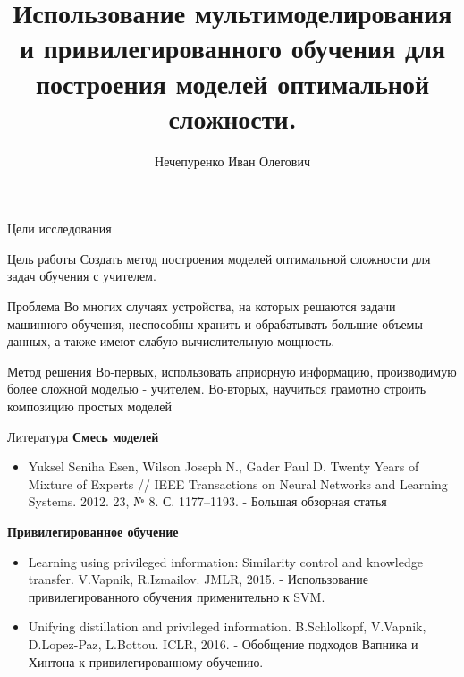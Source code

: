 \documentclass{beamer}
\title[\hbox to 56mm{Мультимоделирование, привилегированное обучение\hfill\insertframenumber\,/\,\inserttotalframenumber}]
{Использование мультимоделирования и привилегированного обучения для построения моделей оптимальной сложности. }
\author[]{\large Нечепуренко  Иван Олегович}
\institute{\large
Московский физико-технический институт \par Факультет Инноваций и Высоких Технологий \par Кафедра анализа данных}
\date{\footnotesize{2019 \par Москва}}
\begin{document}
\begin{frame}
\titlepage
\end{frame}
\begin{frame}{Цели исследования}

\begin{block}{Цель работы}
Создать метод построения моделей
оптимальной сложности для задач обучения с учителем.  
\end{block}

\begin{block}{Проблема}
Во многих случаях устройства,  на которых решаются задачи машинного обучения, неспособны хранить и обрабатывать большие объемы данных, а также имеют слабую вычислительную мощность.
\end{block}

\begin{block}{Метод решения}
Во-первых, использовать априорную информацию, производимую более сложной моделью - учителем.
Во-вторых, научиться грамотно строить  композицию простых моделей
\end{block}

\end{frame}

\begin{frame}{Литература}
\textbf{Смесь моделей}

\begin{itemize}
  \item Yuksel Seniha Esen, Wilson Joseph N., Gader Paul D. Twenty Years of Mixture
of Experts // IEEE Transactions on Neural Networks and Learning Systems. 2012. 23, № 8. С. 1177–1193.
 - Большая обзорная статья
\end{itemize}

\textbf{Привилегированное обучение}

\begin{itemize}
  \item Learning using privileged information: Similarity control and knowledge
transfer. V.Vapnik, R.Izmailov. JMLR, 2015. - Использование привилегированного обучения
применительно к SVM.

    \item Unifying distillation and privileged information. B.Schlolkopf, V.Vapnik,
D.Lopez-Paz, L.Bottou. ICLR, 2016. - Обобщение подходов Вапника и Хинтона к
привилегированному обучению.

\end{itemize}

\end{frame}
\end{document}
